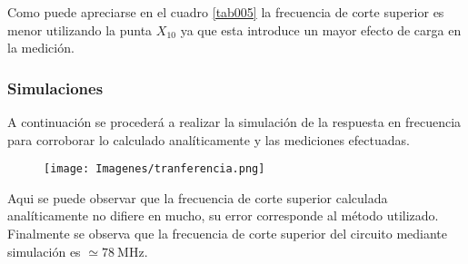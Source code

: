 \documentclass[a4paper,10pt]{article}
\begin{document}
				\indent Como puede apreciarse en el cuadro \ref{tab005} la frecuencia de corte superior es menor utilizando la punta $X_{10}$ ya que esta introduce un
				mayor efecto de carga en la medición. \\

			\subsubsection{Simulaciones}
			\indent A continuación se procederá a realizar la simulación de la respuesta en frecuencia para corroborar lo calculado analíticamente y 
			las mediciones efectuadas. 
			
			\begin{figure}[!htb]
					\centering
						\texttt{[image: Imagenes/tranferencia.png]}
			\end{figure}
			
			Aqui se puede observar que la frecuencia de corte superior calculada analíticamente no difiere en mucho, su error corresponde al m\'{e}todo utilizado.\\
			Finalmente se observa que la frecuencia de corte superior del circuito mediante simulaci\'{o}n es $\simeq 78~\text{MHz}$.\\
\end{document}
